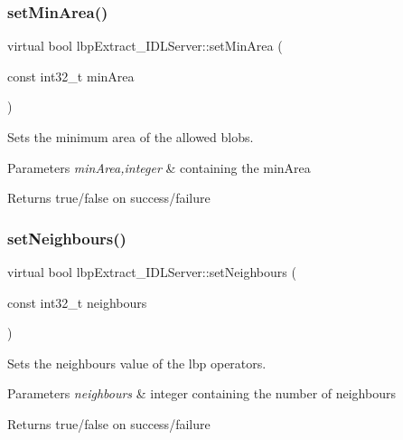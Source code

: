 \subsubsection{\texorpdfstring{setMinArea()}{setMinArea()}}
{\footnotesize\ttfamily virtual bool lbp\+Extract\+\_\+\+I\+D\+L\+Server\+::set\+Min\+Area (\begin{DoxyParamCaption}\item[{const int32\+\_\+t}]{min\+Area }\end{DoxyParamCaption})\hspace{0.3cm}{\ttfamily [virtual]}}



Sets the minimum area of the allowed blobs. 


\begin{DoxyParams}{Parameters}
{\em min\+Area,integer} & containing the min\+Area \\
\hline
\end{DoxyParams}
\begin{DoxyReturn}{Returns}
true/false on success/failure 
\end{DoxyReturn}
\mbox{\label{classlbpExtract__IDLServer_aa72b58e41cf97d26825515cc9d5e6aa6}} 
\subsubsection{\texorpdfstring{setNeighbours()}{setNeighbours()}}
{\footnotesize\ttfamily virtual bool lbp\+Extract\+\_\+\+I\+D\+L\+Server\+::set\+Neighbours (\begin{DoxyParamCaption}\item[{const int32\+\_\+t}]{neighbours }\end{DoxyParamCaption})\hspace{0.3cm}{\ttfamily [virtual]}}



Sets the neighbours value of the lbp operators. 


\begin{DoxyParams}{Parameters}
{\em neighbours} & integer containing the number of neighbours \\
\hline
\end{DoxyParams}
\begin{DoxyReturn}{Returns}
true/false on success/failure 
\end{DoxyReturn}
\mbox{\label{classlbpExtract__IDLServer_a2955fa69c12b59a03c2b1e130747b054}} 
